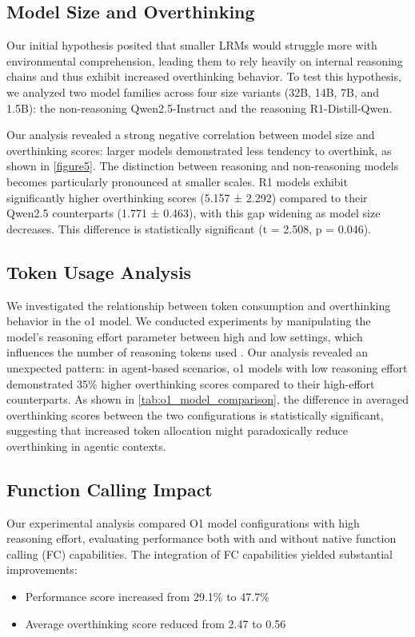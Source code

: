 \subsection{Model Size and Overthinking}
Our initial hypothesis posited that smaller LRMs would struggle more with environmental comprehension, leading them to rely heavily on internal reasoning chains and thus exhibit increased overthinking behavior. To test this hypothesis, we analyzed two model families across four size variants (32B, 14B, 7B, and 1.5B): the non-reasoning Qwen2.5-Instruct and the reasoning R1-Distill-Qwen.

Our analysis revealed a strong negative correlation between model size and overthinking scores: larger models demonstrated less tendency to overthink, as shown in \cref{figure5}. The distinction between reasoning and non-reasoning models becomes particularly pronounced at smaller scales. R1 models exhibit significantly higher overthinking scores (5.157 ± 2.292) compared to their Qwen2.5 counterparts (1.771 ± 0.463), with this gap widening as model size decreases. This difference is statistically significant (t = 2.508, p = 0.046).

\subsection{Token Usage Analysis}
We investigated the relationship between token consumption and overthinking behavior in the o1 model. We conducted experiments by manipulating the model's reasoning effort parameter between high and low settings, which influences the number of reasoning tokens used \cite{openai_chat_api}. Our analysis revealed an unexpected pattern: in agent-based scenarios, o1 models with low reasoning effort demonstrated 35\% higher overthinking scores compared to their high-effort counterparts. As shown in \cref{tab:o1_model_comparison}, the difference in averaged overthinking scores between the two configurations is statistically significant, suggesting that increased token allocation might paradoxically reduce overthinking in agentic contexts.

\subsection{Function Calling Impact}
Our experimental analysis compared O1 model configurations with high reasoning effort, evaluating performance both with and without native function calling (FC) capabilities. The integration of FC capabilities yielded substantial improvements:
\begin{itemize}
    \item Performance score increased from 29.1\% to 47.7\%
    \item Average overthinking score reduced from 2.47 to 0.56
\end{itemize}

